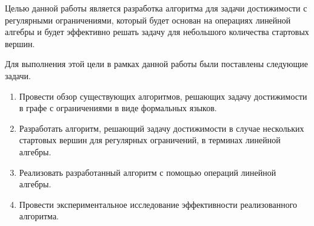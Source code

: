
Целью данной работы является разработка алгоритма для задачи достижимости с регулярными ограничениями, который будет основан на операциях линейной алгебры и будет эффективно решать задачу для небольшого количества стартовых вершин.

Для выполнения этой цели в рамках данной работы были поставлены следующие задачи.

 \begin{enumerate}
 \item Провести обзор существующих алгоритмов, решающих задачу достижимости в графе с ограничениями в виде формальных языков.
 \item Разработать алгоритм, решающий задачу достижимости в случае нескольких стартовых вершин для регулярных ограничений, в терминах линейной алгебры.
 \item Реализовать разработанный алгоритм с помощью операций линейной алгебры.
 \item Провести экспериментальное исследование эффективности реализованного алгоритма.
 \end{enumerate}
